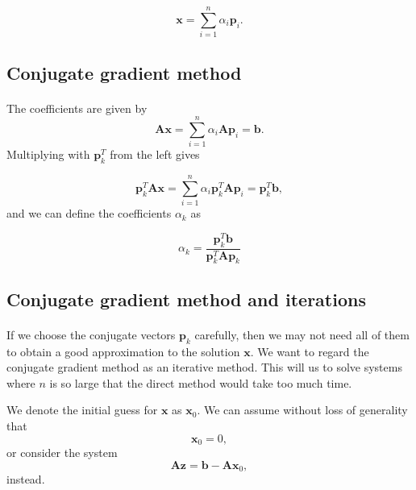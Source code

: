 \documentclass[%
oneside,                 %
final,                   %
10pt]{article}
\begin{document}
\begin{equation*}
  \bm{x}  = \sum^{n}_{i=1} \alpha_i \bm{p}_i.
\end{equation*}



\subsection*{Conjugate gradient method}

\paragraph{}
The coefficients are given by
\begin{equation*}
    \mathbf{A}\mathbf{x} = \sum^{n}_{i=1} \alpha_i \mathbf{A} \mathbf{p}_i = \mathbf{b}.
\end{equation*}
Multiplying with $\bm{p}_k^T$  from the left gives

\begin{equation*}
  \bm{p}_k^T \bm{A}\bm{x} = \sum^{n}_{i=1} \alpha_i\bm{p}_k^T \bm{A}\bm{p}_i= \bm{p}_k^T \bm{b},
\end{equation*}
and we can define the coefficients $\alpha_k$ as

\begin{equation*}
    \alpha_k = \frac{\bm{p}_k^T \bm{b}}{\bm{p}_k^T \bm{A} \bm{p}_k}
\end{equation*}



\subsection*{Conjugate gradient method and iterations}

\paragraph{}

If we choose the conjugate vectors $\bm{p}_k$ carefully, 
then we may not need all of them to obtain a good approximation to the solution 
$\bm{x}$. 
We want to regard the conjugate gradient method as an iterative method. 
This will us to solve systems where $n$ is so large that the direct 
method would take too much time.

We denote the initial guess for $\bm{x}$ as $\bm{x}_0$. 
We can assume without loss of generality that
\begin{equation*}
\bm{x}_0=0,
\end{equation*}
or consider the system
\begin{equation*}
\bm{A}\bm{z} = \bm{b}-\bm{A}\bm{x}_0,
\end{equation*}
instead.
\end{document}
